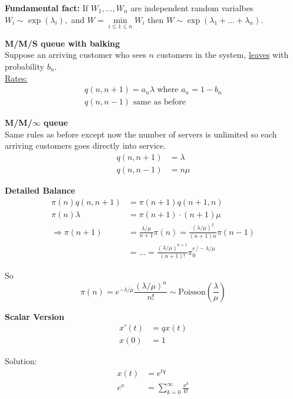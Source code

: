\documentclass[12pt]{article}
\begin{document}
\vspace{1\baselineskip}
{\bf Fundamental fact:} If $W_1,...,W_n$ are independent random varialbes $W_i\sim \exp(\lambda_i),$ and $W=\min\limits_{i\le 1\le n}W_i$ then $W\sim \exp(\lambda_1+...+\lambda_n).$

\vspace{1\baselineskip}
{\bf M/M/S queue with balking}\\
Suppose an arriving customer who sees $n$ customers in the system, \underline{leaves} with probability $b_n$.\\

\underline{Rates:}
\begin{align}
    q(n,n+1)=a_n\lambda \text{ where $a_n=1-b_n$}\nonumber \\
    q(n,n-1) \text{   same as before} \nonumber
\end{align}


\newpage
{\bf M/M/$\infty$ queue}\\
Same rules as before except now the number of servers is unlimited so each arriving customers goes directly into service.
\begin{align}
    q(n,n+1)&=\lambda\nonumber \\
    q(n,n-1)&=n\mu \nonumber
\end{align}

{\bf Detailed Balance}\\
\begin{align}
    \pi(n)q(n,n+1)&=\pi(n+1)q(n+1,n) \nonumber \\
    \pi(n)\lambda &= \pi(n+1)\cdot (n+1)\mu \nonumber \\
    \Rightarrow \pi(n+1) &= \frac{\lambda/\mu}{n+1}\pi(n) = \frac{(\lambda/\mu)^2}{(n+1)n}\pi(n-1) \nonumber \\
    &=\ldots = \frac{(\lambda/\mu)^{n+1}}{(n+1)!}\pi_0^{e^{}/-\lambda/\mu} \nonumber
\end{align}

So $$\pi(n)=e^{-\lambda/\mu} \frac{(\lambda/\mu)^n}{n!} \sim \text{Poisson}\left(\frac{\lambda}{\mu}\right)$$

\vspace{2\baselineskip}
{\bf Scalar Version}
\begin{align}
    x'(t)&=qx(t) \nonumber \\
    x(0)&=1 \nonumber
\end{align}

Solution:
\begin{align}
    x(t)&=e^{tq}\nonumber \\
    e^x&=\sum\limits_{k=0}^\infty \frac{x^k}{k!}\nonumber
\end{align}
\end{document}
